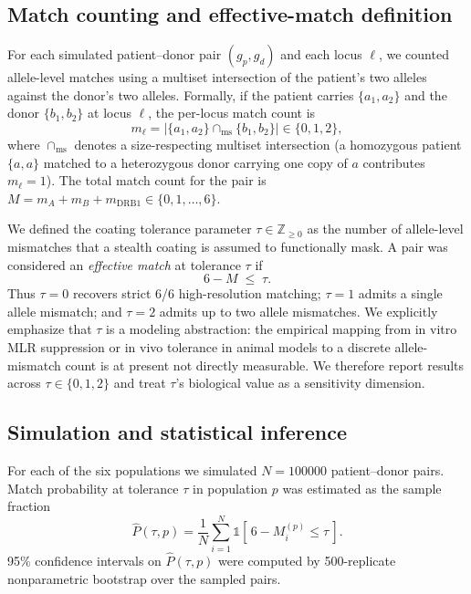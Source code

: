 \documentclass[11pt]{article}
\begin{document}
\subsection{Match counting and effective-match definition}
For each simulated patient--donor pair $(g_p, g_d)$ and each locus $\ell$, we counted allele-level matches using a multiset intersection of the patient's two alleles against the donor's two alleles. Formally, if the patient carries $\{a_1, a_2\}$ and the donor $\{b_1, b_2\}$ at locus $\ell$, the per-locus match count is
\begin{equation}
    m_\ell = \lvert \{a_1, a_2\} \cap_\text{ms} \{b_1, b_2\} \rvert \in \{0, 1, 2\},
\end{equation}
where $\cap_\text{ms}$ denotes a size-respecting multiset intersection (a homozygous patient $\{a, a\}$ matched to a heterozygous donor carrying one copy of $a$ contributes $m_\ell = 1$). The total match count for the pair is $M = m_A + m_B + m_{\text{DRB1}} \in \{0, 1, \dots, 6\}$.

We defined the coating tolerance parameter $\tau \in \mathbb{Z}_{\geq 0}$ as the number of allele-level mismatches that a stealth coating is assumed to functionally mask. A pair was considered an \emph{effective match} at tolerance $\tau$ if
\begin{equation}
    6 - M \;\leq\; \tau.
\end{equation}
Thus $\tau = 0$ recovers strict 6/6 high-resolution matching; $\tau = 1$ admits a single allele mismatch; and $\tau = 2$ admits up to two allele mismatches. We explicitly emphasize that $\tau$ is a modeling abstraction: the empirical mapping from in vitro MLR suppression or in vivo tolerance in animal models to a discrete allele-mismatch count is at present not directly measurable. We therefore report results across $\tau \in \{0, 1, 2\}$ and treat $\tau$'s biological value as a sensitivity dimension.

\subsection{Simulation and statistical inference}
For each of the six populations we simulated $N = \num{100000}$ patient--donor pairs. Match probability at tolerance $\tau$ in population $p$ was estimated as the sample fraction
\begin{equation}
    \hat{P}(\tau, p) = \frac{1}{N} \sum_{i=1}^N \mathbb{1}\!\left[\, 6 - M_i^{(p)} \leq \tau \,\right].
\end{equation}
95\% confidence intervals on $\hat{P}(\tau, p)$ were computed by 500-replicate nonparametric bootstrap over the sampled pairs.
\end{document}

